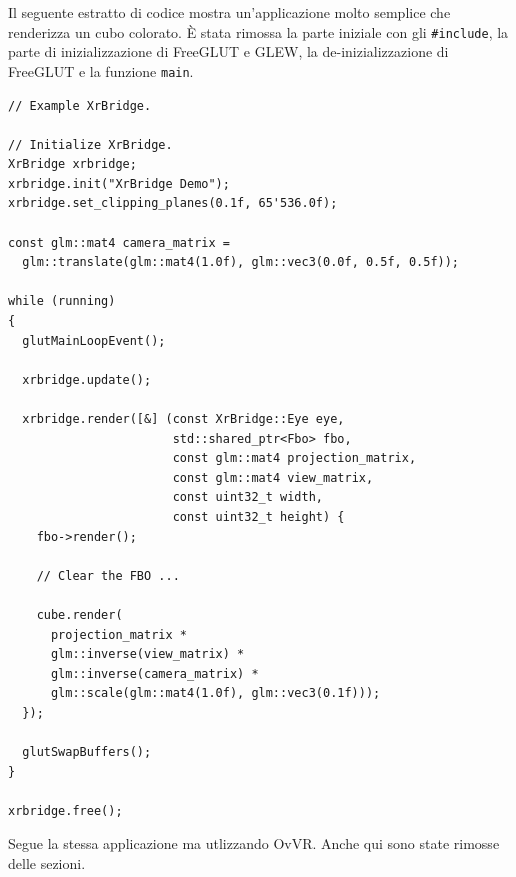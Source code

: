 \documentclass[twoside]{supsistudent}
\begin{document}
Il seguente estratto di codice mostra un'applicazione molto semplice che renderizza un cubo colorato. È stata rimossa la parte iniziale con gli \texttt{\#include}, la parte di inizializzazione di FreeGLUT e GLEW, la de-inizializzazione di FreeGLUT e la funzione \texttt{main}.

\newpage

\begin{verbatim}
// Example XrBridge.

// Initialize XrBridge.
XrBridge xrbridge;
xrbridge.init("XrBridge Demo");
xrbridge.set_clipping_planes(0.1f, 65'536.0f);

const glm::mat4 camera_matrix =
  glm::translate(glm::mat4(1.0f), glm::vec3(0.0f, 0.5f, 0.5f));

while (running)
{
  glutMainLoopEvent();

  xrbridge.update();

  xrbridge.render([&] (const XrBridge::Eye eye,
                       std::shared_ptr<Fbo> fbo,
                       const glm::mat4 projection_matrix,
                       const glm::mat4 view_matrix,
                       const uint32_t width,
                       const uint32_t height) {
    fbo->render();

    // Clear the FBO ...

    cube.render(
      projection_matrix *
      glm::inverse(view_matrix) *
      glm::inverse(camera_matrix) *
      glm::scale(glm::mat4(1.0f), glm::vec3(0.1f)));
  });

  glutSwapBuffers();
}

xrbridge.free();
\end{verbatim}

\newpage

Segue la stessa applicazione ma utlizzando OvVR. Anche qui sono state rimosse delle sezioni.
\end{document}
